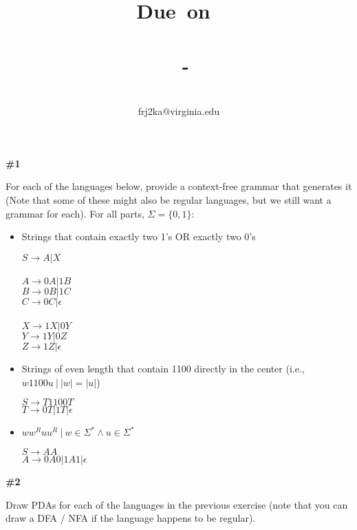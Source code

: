 \documentclass{article}
\title{
    \vspace{2in}
    \textmd{\textbf{\hmwkTitle}}\\
    \normalsize\vspace{0.1in}
    \small{\textbf{Due\ on\ \hmwkDueDate}}\\
    \normalsize\text{Tuesday/Thursday 11:00-12:15, Warner 209}\\
    \vspace{0.1in}\large{\textit{\hmwkClassInstructor\ - \hmwkClassTime}}
    \vspace{3in}
}
\author{\hmwkAuthorName\\\small{frj2ka@virginia.edu}}
\date{}
\newcommand{\problem}[1]{\textbf{\##1}}
\begin{document}
\maketitle

\pagebreak

\problem{1}

For each of the languages below, provide a context-free grammar that generates it (Note that some of these might also be regular languages, but we still want a grammar for each). For all parts, $\Sigma=\{0,1\}$:


\begin{itemize}
	\item Strings that contain exactly two 1's OR exactly two 0's
	
    $S \rightarrow A | X$\\
    \\
    $A \rightarrow 0A | 1B$\\
    $B \rightarrow 0B | 1C$\\
    $C \rightarrow 0C | \epsilon$\\
    \\
    $X \rightarrow 1X | 0Y$\\
    $Y \rightarrow 1Y | 0Z$\\
    $Z \rightarrow 1Z | \epsilon$\\
    
	\item Strings of even length that contain 1100 directly in the center (i.e., $w1100u \ | \ |w|=|u|$)
	
    $S \rightarrow T1100T$\\
    $T \rightarrow 0T | 1T | \epsilon$

	\item $ww^Ruu^R \ | \ w \in \Sigma^* \wedge u \in \Sigma^*$
	
    $S \rightarrow AA$\\
    $A \rightarrow 0A0 | 1A1 | \epsilon$
\end{itemize}
\pagebreak

\problem{2}

Draw PDAs for each of the languages in the previous exercise (note that you can draw a DFA / NFA if the language happens to be regular).
\end{document}
